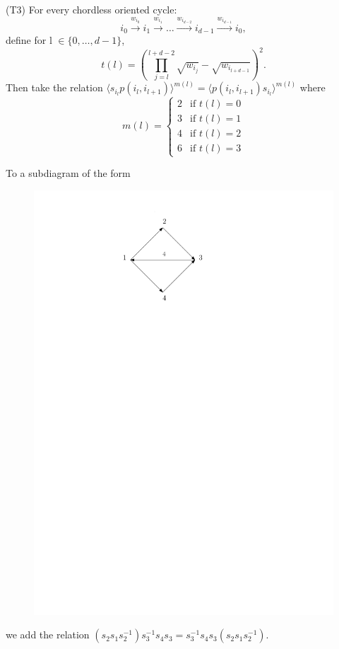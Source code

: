 \documentclass{beamer}
\begin{document}
\begin{frame}
(T3)  For every chordless oriented cycle:
$$i_{0} \stackrel{w_{i_{0}}}{\longrightarrow} i_{1} \stackrel{w_{i_{1}}}{\longrightarrow} \dots \stackrel{w_{i_{d-2}}}{\longrightarrow} i_{d-1} \stackrel{w_{i_{d-1}}}{\longrightarrow} i_{0},$$
define for l $\in \{0, \dots, d-1\}$, 
$$t(l) = (\prod_{j=l}^{l+d-2}{\sqrt{w_{i_{j}}}} - \sqrt{w_{i_{l+d-1}}})^{2}.$$
Then take the relation $\langle s_{i_{l}}p(i_{l}, i_{l+1}) \rangle^{m(l)} = \langle p(i_{l}, i_{l+1})s_{i_{l}} \rangle^{m(l)}$ where
$$m(l) =
\begin{cases}
2 &\text{if $t(l)=0$} \\
3 &\text{if $t(l)=1$} \\
4 &\text{if $t(l)=2$} \\
6 &\text{if $t(l)=3$}
\end{cases}$$
\end{frame}

\begin{frame}
To a subdiagram of the form
\begin{figure}
\includegraphics[scale = .50]{Diagram1.pdf}
\end{figure}
we add the relation $(s_{2}s_{1}s_{2}^{-1})s_{3}^{-1}s_{4}s_{3} = s_{3}^{-1}s_{4}s_{3}(s_{2}s_{1}s_{2}^{-1}).$
\end{frame}
\end{document}
